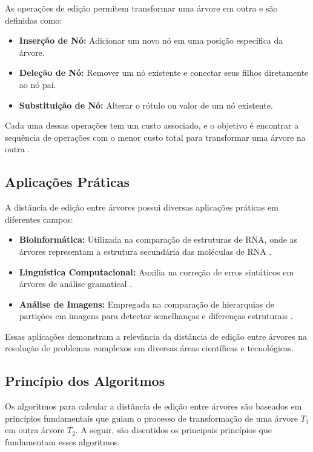 \documentclass[12pt]{article}
\begin{document}
As operações de edição permitem transformar uma árvore em outra e são definidas como:
\begin{itemize}
    \item \textbf{Inserção de Nó:} Adicionar um novo nó em uma posição específica da árvore.
    \item \textbf{Deleção de Nó:} Remover um nó existente e conectar seus filhos diretamente ao nó pai.
    \item \textbf{Substituição de Nó:} Alterar o rótulo ou valor de um nó existente.
\end{itemize}
Cada uma dessas operações tem um custo associado, e o objetivo é encontrar a sequência de operações com o menor custo total para transformar uma árvore na outra \cite{tai1979tree}.

\subsection{Aplicações Práticas}

A distância de edição entre árvores possui diversas aplicações práticas em diferentes campos:
\begin{itemize}
    \item \textbf{Bioinformática:} Utilizada na comparação de estruturas de RNA, onde as árvores representam a estrutura secundária das moléculas de RNA \cite{shapiro1988comparative}.
    \item \textbf{Linguística Computacional:} Auxilia na correção de erros sintáticos em árvores de análise gramatical \cite{joshi1987tree}.
    \item \textbf{Análise de Imagens:} Empregada na comparação de hierarquias de partições em imagens para detectar semelhanças e diferenças estruturais \cite{martin2001database}.
\end{itemize}
Essas aplicações demonstram a relevância da distância de edição entre árvores na resolução de problemas complexos em diversas áreas científicas e tecnológicas.

\subsection{Princípio dos Algoritmos}

Os algoritmos para calcular a distância de edição entre árvores são baseados em princípios fundamentais que guiam o processo de transformação de uma árvore \( T_1 \) em outra árvore \( T_2 \). A seguir, são discutidos os principais princípios que fundamentam esses algoritmos.
\end{document}
